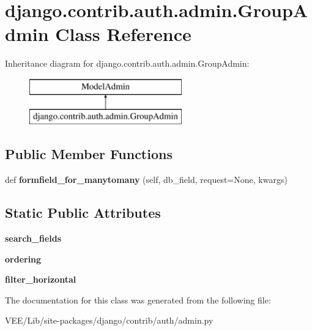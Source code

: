 \hypertarget{classdjango_1_1contrib_1_1auth_1_1admin_1_1_group_admin}{}\section{django.\+contrib.\+auth.\+admin.\+Group\+Admin Class Reference}
\label{classdjango_1_1contrib_1_1auth_1_1admin_1_1_group_admin}
Inheritance diagram for django.\+contrib.\+auth.\+admin.\+Group\+Admin\+:\begin{figure}[H]
\begin{center}
\leavevmode
\includegraphics[height=2.000000cm]{classdjango_1_1contrib_1_1auth_1_1admin_1_1_group_admin}
\end{center}
\end{figure}
\subsection*{Public Member Functions}
\begin{DoxyCompactItemize}
\item 
\mbox{\label{classdjango_1_1contrib_1_1auth_1_1admin_1_1_group_admin_a56028c3608742e6491f40af9ed07127d}} 
def {\bfseries formfield\+\_\+for\+\_\+manytomany} (self, db\+\_\+field, request=None, kwargs)
\end{DoxyCompactItemize}
\subsection*{Static Public Attributes}
\begin{DoxyCompactItemize}
\item 
\mbox{\label{classdjango_1_1contrib_1_1auth_1_1admin_1_1_group_admin_a2f33dea60bb4850eb8af1cb827d79a46}} 
{\bfseries search\+\_\+fields}
\item 
\mbox{\label{classdjango_1_1contrib_1_1auth_1_1admin_1_1_group_admin_aa55fefd47190abbf96bc7b48f772517f}} 
{\bfseries ordering}
\item 
\mbox{\label{classdjango_1_1contrib_1_1auth_1_1admin_1_1_group_admin_a4fec3a3df270c38cc4a6ae6d93e5b6f8}} 
{\bfseries filter\+\_\+horizontal}
\end{DoxyCompactItemize}


The documentation for this class was generated from the following file\+:\begin{DoxyCompactItemize}
\item 
V\+E\+E/\+Lib/site-\/packages/django/contrib/auth/admin.\+py\end{DoxyCompactItemize}
